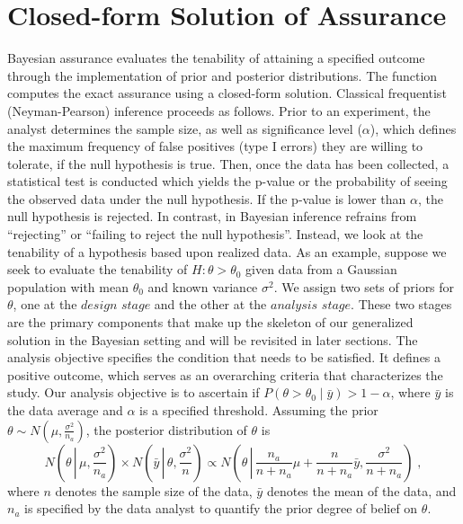 \section{Closed-form Solution of Assurance}\label{sec:closedformassurance}
Bayesian assurance evaluates the tenability of attaining a specified outcome through the implementation of prior and posterior distributions.  The  function computes the exact assurance using a closed-form solution. Classical frequentist (Neyman-Pearson) inference proceeds as follows. Prior to an experiment, the analyst determines the sample size, as well as significance level ($\alpha$), which defines the maximum frequency of false positives (type I errors) they are willing to tolerate, if the null hypothesis is true. Then, once the data has been collected, a statistical test is conducted which yields the p-value or the probability of seeing the observed data under the null hypothesis. If the p-value is lower than $\alpha$, the null hypothesis is rejected. In contrast, in Bayesian inference refrains from ``rejecting'' or ``failing to reject the null hypothesis''. Instead, we look at the tenability of a hypothesis based upon realized data. As an example, suppose we seek to evaluate the tenability of $H : \theta > \theta_0$ given data from a Gaussian population with mean $\theta_0$ and known variance $\sigma^2$. We assign two sets of priors for $\theta$, one at the $\textit{design stage}$ and the other at the  $\textit{analysis stage}$. These two stages are the  primary components that make up the skeleton of our generalized solution in the Bayesian setting and will be revisited in later sections. The analysis objective specifies the condition that needs to be satisfied. It defines a positive outcome, which serves as an overarching criteria that characterizes the study. 
{O}ur analysis objective is to ascertain if
$P(\theta > \theta_0 \mid \bar{y}) > 1-\alpha$, where $\bar{y}$ is the data average and 
$\alpha$ is a specified threshold.  Assuming the prior $\theta \sim N\left(\mu, \frac{\sigma^2}{n_a}\right)$, the posterior distribution of $\theta$ is
\begin{equation}\label{eq: simple_posterior}
N\left(\theta {\, \left | \, \mu, \frac{\sigma^2}{n_a} \right.}\right) \times N\left(\bar{y} {\, \left |\, \theta, \frac{\sigma^2}{n} \right.}\right)
\propto N\left(\theta {\, \left |\, \frac{n_a}{n + n_a}\mu + \frac{n}{n + n_a}\bar{y}, \frac{\sigma^2}{n + n_a}\right.}\right)\;,
\end{equation}
where $n$ denotes the sample size of the data, $\bar{y}$ denotes the mean of the data, and $n_a$ is specified by the data analyst to quantify the prior degree of belief on $\theta$.

